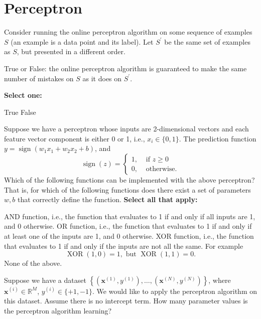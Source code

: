 \documentclass[11pt,addpoints,answers]{exam}
\numberwithin{equation}{section} %
\numberwithin{figure}{section} %
\numberwithin{table}{section} %
\newcommand{\xv}{\mathbf{x}}
\begin{document}
\section{Perceptron}
\begin{questions}
    \question[1] Consider running the online perceptron algorithm on some sequence of examples $S$ (an example is a data point and its label). Let $S^\prime$ be the same set of examples as $S$, but presented in a different order.
    
    True or False: the online perceptron algorithm is guaranteed to make the same number of mistakes on $S$ as it does on $S^\prime$.

    \textbf{Select one:}
    \begin{checkboxes}
        \CorrectChoice True
        \choice False
    \end{checkboxes}


    
    \question[3] Suppose we have a perceptron whose inputs are 2-dimensional vectors and each feature vector component is either 0 or 1, i.e., $x_i \in \{0,1\}$. The prediction function $y = \operatorname{sign}(w_1x_1 + w_2x_2 + b)$, and
    $$
    \operatorname{sign}(z) = 
    \begin{cases}
    1, & \textrm{ if } z \geq 0\\
    0, & \textrm{ otherwise}.
    \end{cases}
    $$
    Which of the following functions can be implemented with the above perceptron? That is, for which of the following functions does there exist a set of parameters $w,b$ that correctly define the function. 
    \textbf{Select all that apply:}
    {
    \checkboxchar{$\Box$} \checkedchar{$\blacksquare$}
    \begin{checkboxes}
        \CorrectChoice AND function, i.e., the function that evaluates to 1 if and only if all inputs are 1, and 0 otherwise.
        \CorrectChoice OR function, i.e., the function that evaluates to 1 if and only if at least one of the inputs are 1, and 0 otherwise.
        \choice XOR function, i.e., the function that evaluates to 1 if and only if the inputs are not all the same. For example
        $$
        \operatorname{XOR}(1,0) = 1, \textrm{ but } \operatorname{XOR}(1,1) = 0.
        $$
        \choice None of the above.
    \end{checkboxes}
    }

    
    
    \clearpage
    
    \question[2] Suppose we have a dataset $\left\{ \left(\xv^{(1)},y^{(1)}\right),\ldots, \left(\xv^{(N)},y^{(N)}\right) \right\}$, where $\xv^{(i)} \in \mathbb{R}^M$, $y^{(i)}\in\{+1,-1\}$. We would like to apply the perceptron algorithm on this dataset. Assume there is no intercept term. How many parameter values is the perceptron algorithm learning?


\end{questions}
\end{document}
